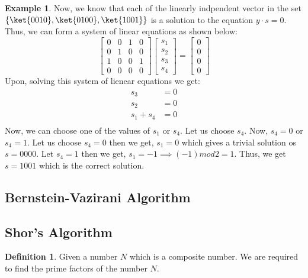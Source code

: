 \documentclass[12pt, oneside]{book}
\theoremstyle{definition}
\newtheorem{definition}{Definition}[section]
\theoremstyle{definition}
\newtheorem{example}{Example}[section]
\theoremstyle{remark}
\begin{document}
\begin{example}
    Now, we know that each of the linearly indpendent vector in the set $\{\ket{0010},\ket{0100},\ket{1001}\}$ is a solution to the equation $y\cdot s=0$. Thus, we can form a system of linear equations as shown below:
    \[
    \begin{bmatrix}
        0 & 0 & 1 & 0 \\
        0 & 1 & 0 & 0 \\
        1 & 0 & 0 & 1 \\
        0 & 0 & 0 & 0
    \end{bmatrix}
    \begin{bmatrix}
        s_1 \\
        s_2 \\
        s_3 \\
        s_4 
    \end{bmatrix}
    =
    \begin{bmatrix}
        0 \\
        0 \\
        0 \\
        0
    \end{bmatrix}
    \]
    Upon, solving this system of lienear equations we get:
    \begin{align*}
    s_3&=0 \\
    s_2&=0 \\
    s_1 + s_4 &=0 \\
    \end{align*}
    Now, we can choose one of the values of $s_1$ or $s_4$. Let us choose $s_4$.
    Now, $s_4=0$ or $s_4=1$. 
    Let us choose $s_4=0$ then we get, $s_1=0$ which gives a trivial solution os $s=0000$. Let $s_4=1$ then we get, $s_1=-1\implies (-1) mod 2=1$.
    Thus, we get $s=1001$ which is the correct solution.
\end{example}


\subsection{Bernstein-Vazirani Algorithm}

\subsection{Shor's Algorithm}
\begin{definition}
    Given a number $N$ which is a composite number. We are required to find the prime factors of the number $N$.
\end{definition}
\end{document}
